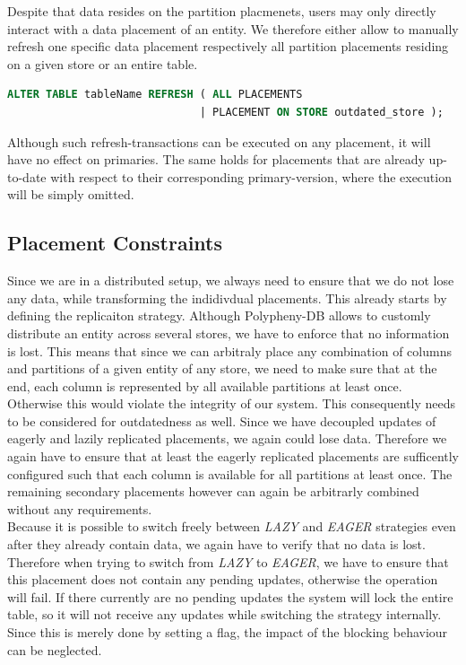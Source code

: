 Despite that data resides on the partition placmenets, users may only directly interact with a data placement of an entity.
We therefore either allow to manually refresh one specific data placement respectively all partition placements residing on a given store or an entire table.

\begin{lstlisting}[language=sql, caption={SQL Statement Syntax for an On-Demand Refresh Operation},label={lst:refresh}]
ALTER TABLE tableName REFRESH ( ALL PLACEMENTS 
                              | PLACEMENT ON STORE outdated_store );
\end{lstlisting}

Although such refresh-transactions can be executed on any placement, it will have no effect on primaries. 
The same holds for placements that are already up-to-date with respect to their corresponding primary-version, where the execution will be simply omitted.





\subsection{Placement Constraints}
\label{sec:constraints}

Since we are in a distributed setup, we always need to ensure that we do not lose any data, while transforming the indidivdual placements. 
This already starts by defining the replicaiton strategy. Although Polypheny-DB allows to customly distribute an entity across several stores, we have to enforce that no 
information is lost. This means that since we can arbitraly place any combination of columns and partitions of a given entity of any store, we need to make sure that at the end, 
each column is represented by all available partitions at least once. Otherwise this would violate the integrity of our system. 
This consequently needs to be considered for outdatedness as well. Since we have decoupled updates of eagerly and lazily replicated placements, we again could lose data. 
Therefore we again have to ensure that at least the eagerly replicated placements are sufficently configured such that each column is available for all partitions at least once.
The remaining secondary placements however can again be arbitrarly combined without any requirements.\\
Because it is possible to switch freely between \emph{LAZY} and \emph{EAGER} strategies even after they already contain data, we again have to verify that no data is lost.
Therefore when trying to switch from \emph{LAZY} to \emph{EAGER}, we have to ensure that this placement does not contain any pending updates, otherwise the operation will fail.
If there currently are no pending updates the system will lock the entire table, so it will not receive any updates while switching the strategy internally. 
Since this is merely done by setting a flag, the impact of the blocking behaviour can be neglected.\\

